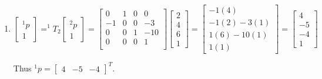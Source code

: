 \documentclass[12pt,letterpaper]{article}
\begin{document}
\begin{enumerate}
\item 
$
\begin{bmatrix} ^{1}p \\ 1\end{bmatrix}
= ^{1}T_2 \begin{bmatrix} ^{2}p \\ 1\end{bmatrix}
= \begin{bmatrix}
 0 & 1 & 0 &   0\\
-1 & 0 & 0 &  -3\\
 0 & 0 & 1 & -10\\
 0 & 0 & 0 &   1\\
\end{bmatrix}
\begin{bmatrix} 2 \\ 4 \\ 6 \\ 1\end{bmatrix}
= \begin{bmatrix} -1(4) \\ -1(2) - 3(1) \\ 1(6) - 10(1) \\ 1(1) \end{bmatrix}
= \begin{bmatrix} 4 \\ -5 \\ -4 \\ 1\end{bmatrix}
$

Thus $^{1}p = \begin{bmatrix} 4 & -5 & -4\end{bmatrix}^T$.


\end{enumerate}
\end{document}
